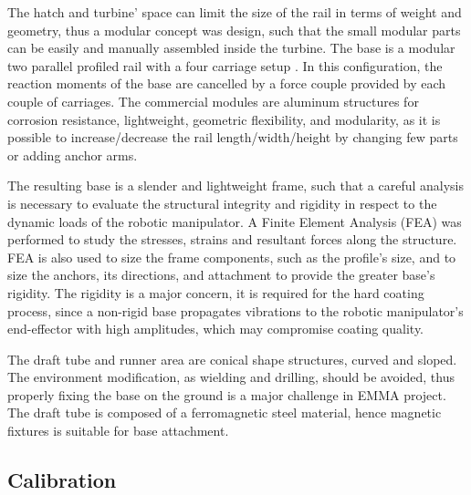 The hatch and turbine' space can limit the size of the rail in terms of weight
and geometry, thus a modular concept was design, such that the small modular parts can be easily and
manually assembled inside the turbine. The base is a modular two parallel
profiled rail with a four carriage setup%
. In this
configuration, the reaction moments of the base are cancelled by a force couple provided by each couple of
carriages. The commercial modules are aluminum structures for corrosion resistance,
lightweight, geometric flexibility, and modularity, as it is possible to
increase/decrease the rail length/width/height by changing few parts or adding
anchor arms.

The resulting base is a slender and lightweight frame, such that a careful
analysis is necessary to evaluate the structural integrity and rigidity in
respect to the dynamic loads of the robotic manipulator. A Finite Element
Analysis (FEA) was performed to study the stresses, strains and resultant forces
along the structure. FEA is also used to size the frame components, such as
the profile's size, and to size the anchors, its directions, and attachment to
provide the greater base's rigidity. The rigidity is a major concern, it is
required for the hard coating process, since a non-rigid base propagates
vibrations to the robotic manipulator's end-effector with high amplitudes, which
may compromise coating quality.

The draft tube and runner area are conical shape structures, curved and
sloped. The environment modification, as wielding and drilling, should be
avoided, thus properly fixing the base on the ground is a major challenge in
EMMA project. The draft tube is composed of a ferromagnetic steel material,
hence magnetic fixtures is suitable for base attachment. 

\subsection{Calibration}

